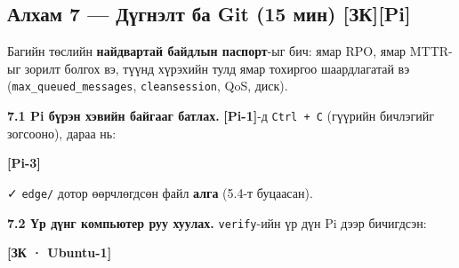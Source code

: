\begin{longtable}[]{@{}llllllllll@{}}
\begin{minipage}[t]{0.07\columnwidth}
\strut
\end{minipage} & \begin{minipage}[t]{0.07\columnwidth}\raggedright
\strut
\end{minipage} & \begin{minipage}[t]{0.07\columnwidth}\raggedright
\strut
\end{minipage} & \begin{minipage}[t]{0.07\columnwidth}\raggedright
\strut
\end{minipage}\tabularnewline
\bottomrule
\end{longtable}\endgroup

\hypertarget{ux430ux43bux445ux430ux43c-7-ux434ux4afux433ux43dux44dux43bux442-ux431ux430-git-15-ux43cux438ux43d-ux437ux43api}{%
\subsection{Алхам 7 --- Дүгнэлт ба Git (15 мин) {[}ЗК{]}{[}Pi{]}}\label{ux430ux43bux445ux430ux43c-7-ux434ux4afux433ux43dux44dux43bux442-ux431ux430-git-15-ux43cux438ux43d-ux437ux43api}}

Багийн төслийн \textbf{найдвартай байдлын паспорт}-ыг бич: ямар RPO, ямар MTTR-ыг зорилт болгох вэ, түүнд хүрэхийн тулд ямар тохиргоо шаардлагатай вэ (\texttt{max\_\allowbreak{}queued\_\allowbreak{}messages}, \texttt{cleansession}, QoS, диск).

\textbf{7.1 Pi бүрэн хэвийн байгааг батлах.} \textbf{{[}Pi-1{]}}-д \texttt{Ctrl\ +\ C} (гүүрийн бичлэгийг зогсооно), дараа нь:

\textbf{{[}Pi-3{]}}

\begin{Shaded}
\begin{Highlighting}[]
\end{Highlighting}
\end{Shaded}

✓ \texttt{edge/} дотор өөрчлөгдсөн файл \textbf{алга} (5.4-т буцаасан).

\textbf{7.2 Үр дүнг компьютер руу хуулах.} \texttt{verify}-ийн үр дүн Pi дээр бичигдсэн:

\textbf{{[}ЗК · Ubuntu-1{]}}

\begin{Shaded}
\begin{Highlighting}[]
 \KeywordTok{\textbackslash{}}
      
\end{Highlighting}
\end{Shaded}

